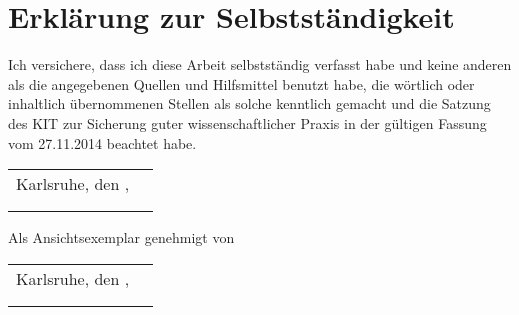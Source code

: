 \chapter*{Erklärung zur Selbstständigkeit}
Ich versichere, dass ich diese Arbeit selbstständig verfasst habe und keine %
anderen als die angegebenen Quellen und Hilfsmittel benutzt habe, die %
wörtlich oder inhaltlich übernommenen Stellen als solche kenntlich gemacht und %
die Satzung des KIT zur Sicherung guter wissenschaftlicher Praxis in der %
gültigen Fassung vom 27.11.2014 beachtet habe.\\

\vspace{1cm}

\renewcommand{\arraystretch}{0} %

\begin{flushright}
	\begin{tabular}{rr}
		Karlsruhe, den \thesistimehandin, & \hspace*{5cm}\\[0mm]
		\cline{2-2}\\[2mm]    %
		& \thesisauthor       %
	\end{tabular}
\end{flushright}

\vfill

\begin{flushright}
	Als Ansichtsexemplar genehmigt von\\
	\vspace{1cm}
	\begin{tabular}{rr}
		Karlsruhe, den \thesistimehandin, & \hspace*{5cm}\\[0mm]
		\cline{2-2}\\[2mm]    %
		& \thesisreviewerone  %
	\end{tabular}
\end{flushright}

\renewcommand{\arraystretch}{1}

\cleardoublepage

